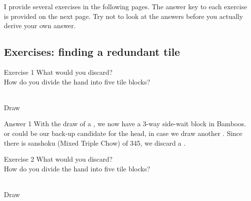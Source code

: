 \bigskip
I provide several exercises in the following pages. The answer key to each exercise is provided on the next page. Try not to look at the answers before you actually derive your own answer. 

\vfill

\subsection*{Exercises: finding a redundant tile}

\bigskip

\begin{itembox}[l]{Exercise 1}
What would you discard? \\
\vsp
How do you divide the hand into five tile blocks? 

\bp
{}~\\
\hspace{290pt}\footnotesize{Draw}
\ep
\end{itembox}

\newpage

\begin{itembox}[r]{Answer 1}
\emj
With the draw of a {\large{}}, we now have a 3-way side-wait block in Bamboos. {\large{}} or {\large{}} could be our back-up candidate for the head, in case we draw another {\large{}}. Since there is {\jap sanshoku} (Mixed Triple Chow) of 345, we discard a {\large{}}. 
\end{itembox}

\vfill

\begin{itembox}[l]{Exercise 2}
What would you discard? \\
\vsp
How do you divide the hand into five tile blocks? 

\bp
{}~\\
\hspace{290pt}\footnotesize{Draw}
\ep
\end{itembox}

\newpage


